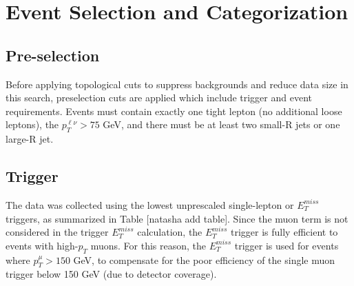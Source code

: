 \section{Event Selection and Categorization}

\subsection{Pre-selection}
Before applying topological cuts to suppress backgrounds and reduce data size in this search, preselection cuts are applied which include trigger and event requirements. Events must contain exactly one tight lepton (no additional loose leptons),  the $p_{T}^{\ell \nu} > 75$ GeV, and there must be at least two small-R jets or one large-R jet.
\subsection{Trigger}
The data was collected using the lowest unprescaled single-lepton or $E_{T}^{miss}$ triggers, as summarized in Table [natasha add table]. Since the muon term is not considered in the trigger $E_{T}^{miss}$ calculation, the $E_{T}^{miss}$ trigger is fully efficient to events with high-$p_{T}$ muons. For this reason, the $E_{T}^{miss}$  trigger is used for events where $p_{T}^{\mu} > 150$ GeV, to compensate for the poor efficiency of the single muon trigger below 150 GeV (due to detector coverage). 


